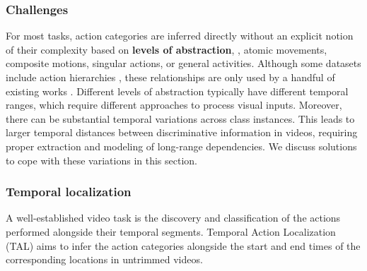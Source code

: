 \subsubsection{Challenges} 
For most tasks, action categories are inferred directly without an explicit notion of their complexity based on \textbf{levels of abstraction}, \eg, atomic movements, composite motions, singular actions, or general activities. Although some datasets include action hierarchies \citep{shao2020finegym,li2018resound}, these relationships are only used by a handful of existing works \citep{mettes2020searching}. Different levels of abstraction typically have different temporal ranges, which require different approaches to process visual inputs. Moreover, there can be substantial temporal variations across class instances. This leads to larger temporal distances between discriminative information in videos, requiring proper extraction and modeling of long-range dependencies. We discuss solutions to cope with these variations in this section.

\subsubsection{Temporal localization} 

A well-established video task is the discovery and classification of the actions performed alongside their temporal segments. Temporal Action Localization (TAL) aims to infer the action categories alongside the start and end times of the corresponding locations in untrimmed videos. 




